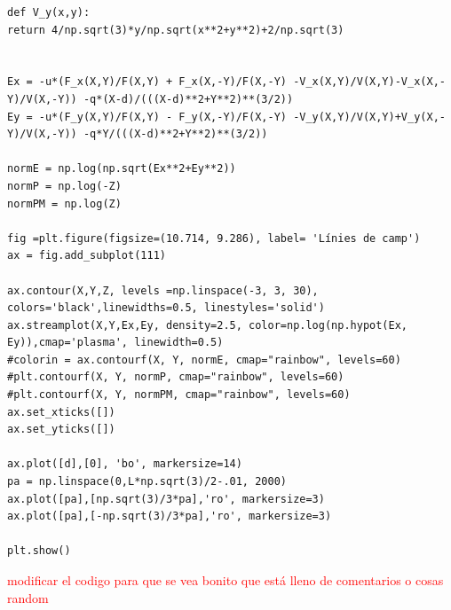 \documentclass[a4paper,10.5pt]{report}
\begin{document}
\begin{appendices}
\begin{lstlisting}
def V_y(x,y):
return 4/np.sqrt(3)*y/np.sqrt(x**2+y**2)+2/np.sqrt(3)


Ex = -u*(F_x(X,Y)/F(X,Y) + F_x(X,-Y)/F(X,-Y) -V_x(X,Y)/V(X,Y)-V_x(X,-Y)/V(X,-Y)) -q*(X-d)/(((X-d)**2+Y**2)**(3/2))
Ey = -u*(F_y(X,Y)/F(X,Y) - F_y(X,-Y)/F(X,-Y) -V_y(X,Y)/V(X,Y)+V_y(X,-Y)/V(X,-Y)) -q*Y/(((X-d)**2+Y**2)**(3/2))

normE = np.log(np.sqrt(Ex**2+Ey**2))
normP = np.log(-Z)
normPM = np.log(Z)

fig =plt.figure(figsize=(10.714, 9.286), label= 'Línies de camp') 
ax = fig.add_subplot(111)

ax.contour(X,Y,Z, levels =np.linspace(-3, 3, 30), colors='black',linewidths=0.5, linestyles='solid')
ax.streamplot(X,Y,Ex,Ey, density=2.5, color=np.log(np.hypot(Ex, Ey)),cmap='plasma', linewidth=0.5)
#colorin = ax.contourf(X, Y, normE, cmap="rainbow", levels=60)
#plt.contourf(X, Y, normP, cmap="rainbow", levels=60)
#plt.contourf(X, Y, normPM, cmap="rainbow", levels=60)
ax.set_xticks([])
ax.set_yticks([])

ax.plot([d],[0], 'bo', markersize=14)
pa = np.linspace(0,L*np.sqrt(3)/2-.01, 2000)
ax.plot([pa],[np.sqrt(3)/3*pa],'ro', markersize=3)
ax.plot([pa],[-np.sqrt(3)/3*pa],'ro', markersize=3)

plt.show()
\end{lstlisting}

\textcolor{red}{modificar el codigo para que se vea bonito que está lleno de comentarios o cosas random}

\end{appendices}
\end{document}
